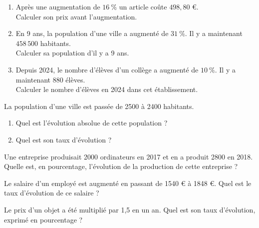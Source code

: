 {%
\begin{Exercice}
\leavevmode\vspace{-\baselineskip}
\begin{enumerate}
	\item Après une augmentation de $16~\%$ un article coûte $498{,}80$ €. \\
                Calculer son prix avant l'augmentation.
	\item En 9 ans, la population d'une ville a augmenté de $31~\%$. Il y a maintenant $458\,500$ habitants. \\
                Calculer sa population d'il y a 9 ans.
	\item Depuis 2024, le nombre d'élèves d'un collège a augmenté de $10~\%$. Il y a maintenant $880$ élèves.\\
                 Calculer le nombre d'élèves en 2024 dans cet établissement.
\end{enumerate}
\end{Exercice}

\begin{Exercice} %

La population d'une ville est passée de 2500 à 2400 habitants.
\begin{enumerate}
\item Quel est l'évolution absolue de cette population ?
\item Quel est son taux d'évolution ?
\end{enumerate}
\end{Exercice}

\begin{Exercice} %

Une entreprise produisait 2000 ordinateurs en 2017 et en a produit 2800 en 2018. Quelle est, en pourcentage, l'évolution de la production de cette entreprise ?
\end{Exercice}


\begin{Exercice} %

Le salaire d'un employé est augmenté en passant de 1540 € à 1848 €. Quel est le taux d'évolution de ce salaire ?
\end{Exercice}


\begin{Exercice} %
Le prix d'un objet a été multiplié par 1,5 en un an. Quel est son taux d'évolution, exprimé en pourcentage ?
\end{Exercice}

}
